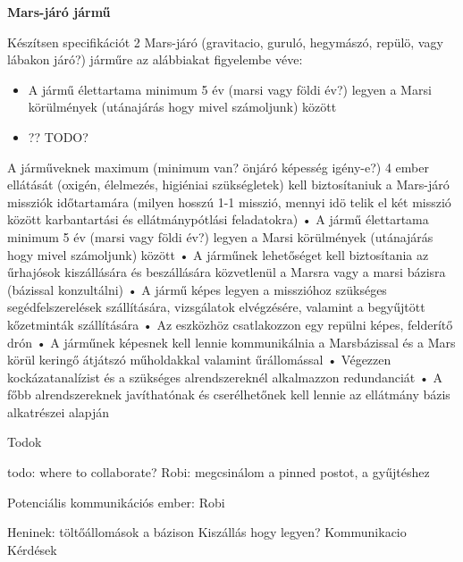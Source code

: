 \documentclass[12pt]{report}
\begin{document}
\textbf{Mars-járó jármű}

Készítsen specifikációt 2 Mars-járó (gravitacio, guruló, hegymászó, repülö, vagy lábakon járó?) járműre az alábbiakat figyelembe véve:

\begin{itemize}
    \item A jármű élettartama minimum 5 év (marsi vagy földi év?) legyen a Marsi körülmények (utánajárás hogy mivel számoljunk) között
    \item ?? TODO?
\end{itemize}

A járműveknek maximum (minimum van? önjáró képesség igény-e?) 4 ember ellátását (oxigén, élelmezés, higiéniai szükségletek) kell biztosítaniuk a Mars-járó missziók időtartamára (milyen hosszú 1-1 misszió, mennyi idö telik el két misszió között karbantartási és ellátmánypótlási feladatokra)
• A jármű élettartama minimum 5 év (marsi vagy földi év?) legyen a Marsi körülmények (utánajárás hogy mivel számoljunk) között
• A járműnek lehetőséget kell biztosítania az űrhajósok kiszállására és beszállására
közvetlenül a Marsra vagy a marsi bázisra (bázissal konzultálni)
• A jármű képes legyen a misszióhoz szükséges segédfelszerelések szállítására, vizsgálatok
elvégzésére, valamint a begyűjtött kőzetminták szállítására
• Az eszközhöz csatlakozzon egy repülni képes, felderítő drón
• A járműnek képesnek kell lennie kommunikálnia a Marsbázissal és a Mars körül keringő
átjátszó műholdakkal valamint űrállomással
• Végezzen kockázatanalízist és a szükséges alrendszereknél alkalmazzon redundanciát
• A főbb alrendszereknek javíthatónak és cserélhetőnek kell lennie az ellátmány bázis
alkatrészei alapján

Todok

todo: where to collaborate? 
Robi: megcsinálom a pinned postot, a gyűjtéshez

Potenciális kommunikációs ember: Robi


Heninek: 
töltőállomások a bázison
Kiszállás hogy legyen?
Kommunikacio
Kérdések
\end{document}
